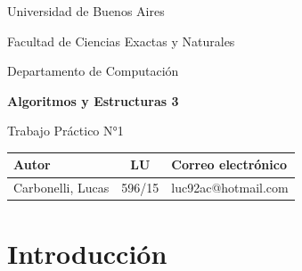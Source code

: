 \documentclass{article}
\begin{document}
\begin{titlepage}
	\centering
	\vspace{1cm}
	{\normalfont\huge Universidad de Buenos Aires \par}
	\vspace{1cm}
	{\normalfont\Large Facultad de Ciencias Exactas y Naturales\par}
	{\normalfont\Large Departamento de Computación\par}
	\vspace{1.5cm}
	{\bfseries\huge Algoritmos y Estructuras 3 \par}
	\vspace{1.5cm}
	{\normalfont\huge Trabajo Práctico N°1 \par}
	\vspace{1.5cm}
	
	{\large
		\begin{tabular}{l c l}
		Autor & LU & Correo electrónico \\
		\hline
		Carbonelli, Lucas 	& 596/15 & luc92ac@hotmail.com \\
		\end{tabular}
	}
	


\end{titlepage}

\newpage

\textbf{\tableofcontents{}}

\newpage

\section{Introducción}
\end{document}
